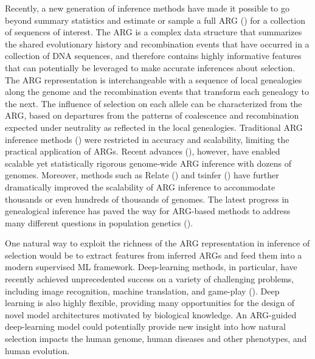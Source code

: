Recently, a new generation of inference methods have made it possible to go beyond summary statistics and estimate or sample a full \ac{ARG} (\cite{hudson_gene_1990,griffiths_ancestral_1996,wiuf_recombination_1999}) for a collection of sequences of interest. The \ac{ARG} is a complex data structure that summarizes the shared evolutionary history and recombination events that have occurred in a collection of DNA sequences, and therefore contains highly informative features that can potentially be leveraged to make accurate inferences about selection. The \ac{ARG} representation is interchangeable with a sequence of local genealogies along the genome and the recombination events that transform each genealogy to the next. The influence of selection on each allele can be characterized from the \ac{ARG}, based on departures from the patterns of coalescence and recombination expected under neutrality as reflected in the local genealogies. Traditional \ac{ARG} inference methods (\cite{hein_heuristic_1993,song_constructing_2005,minichiello_mapping_2006,kuhner_lamarc_2006,ofallon_acg_2013}) were restricted in accuracy and scalability, limiting the practical application of \acp{ARG}. Recent advances (\cite{rasmussen_genome-wide_2014}), however, have enabled scalable yet statistically rigorous genome-wide \ac{ARG} inference with dozens of genomes. Moreover, methods such as Relate (\cite{speidel_method_2019}) and tsinfer (\cite{kelleher_inferring_2019}) have further dramatically improved the scalability of \ac{ARG} inference to accommodate thousands or even hundreds of thousands of genomes. The latest progress in genealogical inference has paved the way for \ac{ARG}-based methods to address many different questions in population genetics (\cite{arenas_importance_2013,rasmussen_genome-wide_2014,kelleher_inferring_2019,speidel_method_2019}).

One natural way to exploit the richness of the \ac{ARG} representation in inference of selection would be to extract features from inferred \acp{ARG} and feed them into a modern supervised \ac{ML} framework. Deep-learning methods, in particular, have recently achieved unprecedented success on a variety of challenging problems, including image recognition, machine translation, and game-play (\cite{lecun_deep_2015}). Deep learning is also highly flexible, providing many opportunities for the design of novel model architectures motivated by biological knowledge. An \ac{ARG}-guided deep-learning model could potentially provide new insight into how natural selection impacts the human genome, human diseases and other phenotypes, and human evolution.

